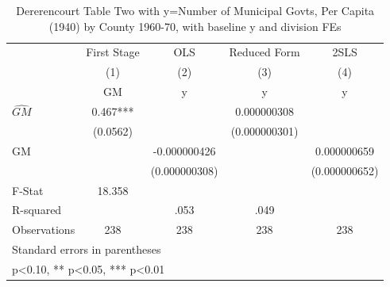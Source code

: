 \begin{table}[htbp]\centering
\def\sym#1{\ifmmode^{#1}\else\(^{#1}\)\fi}
\caption{Dererencourt Table Two with y=Number of Municipal Govts, Per Capita (1940) by County 1960-70, with baseline y and division FEs}
\begin{tabular}{l*{4}{c}}
\toprule
                    & First Stage   &         OLS   &Reduced Form   &        2SLS   \\
                    &\multicolumn{1}{c}{(1)}&\multicolumn{1}{c}{(2)}&\multicolumn{1}{c}{(3)}&\multicolumn{1}{c}{(4)}\\
                    &\multicolumn{1}{c}{GM}&\multicolumn{1}{c}{y}&\multicolumn{1}{c}{y}&\multicolumn{1}{c}{y}\\
\midrule
$\hat{GM}$          &       0.467***&               & 0.000000308   &               \\
                    &    (0.0562)   &               &(0.000000301)   &               \\
\addlinespace
GM                  &               &-0.000000426   &               & 0.000000659   \\
                    &               &(0.000000308)   &               &(0.000000652)   \\
\midrule
F-Stat              &      18.358   &               &               &               \\
R-squared           &               &        .053   &        .049   &               \\
Observations        &         238   &         238   &         238   &         238   \\
\bottomrule
\multicolumn{5}{l}{\footnotesize Standard errors in parentheses}\\
\multicolumn{5}{l}{\footnotesize * p<0.10, ** p<0.05, *** p<0.01}\\
\end{tabular}
\end{table}
